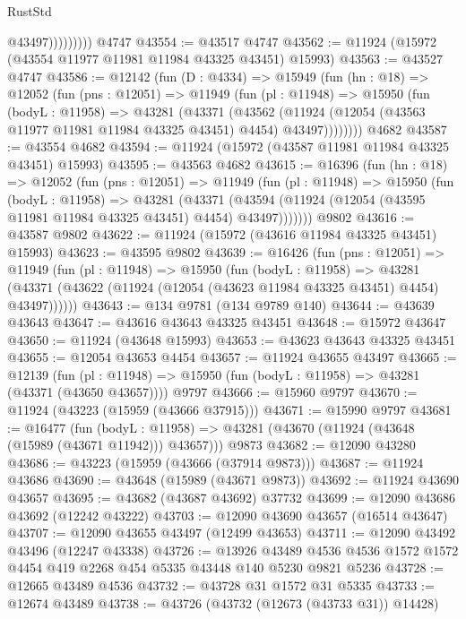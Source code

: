 \begin{lexlean}{RustStd}
\begin{coremodule}
{\begin{coremodule}
{{{{{{{{{{{{{{{{{{{{{{{{{{{{{{{{{{{{{{{{{{{{{{{{{{{{{{{{{{{{{{{{{{{{{{{{{{{{{{{{                      @43497)))))))))
    @4747
@43554 := @43517 @4747
@43562 := @11924 (@15972 (@43554 @11977 @11981 @11984 @43325 @43451) @15993)
@43563 := @43527 @4747
@43586 := @12142
    (fun (D : @4334) =>
    @15949
      (fun (hn : @18) =>
      @12052
        (fun (pns : @12051) =>
        @11949
          (fun (pl : @11948) =>
          @15950
            (fun (bodyL : @11958) =>
            @43281
              (@43371
                (@43562
                  (@11924 (@12054 (@43563 @11977 @11981 @11984 @43325 @43451) @4454) @43497))))))))
    @4682
@43587 := @43554 @4682
@43594 := @11924 (@15972 (@43587 @11981 @11984 @43325 @43451) @15993)
@43595 := @43563 @4682
@43615 := @16396
    (fun (hn : @18) =>
    @12052
      (fun (pns : @12051) =>
      @11949
        (fun (pl : @11948) =>
        @15950
          (fun (bodyL : @11958) =>
          @43281
            (@43371
              (@43594 (@11924 (@12054 (@43595 @11981 @11984 @43325 @43451) @4454) @43497)))))))
    @9802
@43616 := @43587 @9802
@43622 := @11924 (@15972 (@43616 @11984 @43325 @43451) @15993)
@43623 := @43595 @9802
@43639 := @16426
    (fun (pns : @12051) =>
    @11949
      (fun (pl : @11948) =>
      @15950
        (fun (bodyL : @11958) =>
        @43281 (@43371 (@43622 (@11924 (@12054 (@43623 @11984 @43325 @43451) @4454) @43497))))))
@43643 := @134 @9781 (@134 @9789 @140)
@43644 := @43639 @43643
@43647 := @43616 @43643 @43325 @43451
@43648 := @15972 @43647
@43650 := @11924 (@43648 @15993)
@43653 := @43623 @43643 @43325 @43451
@43655 := @12054 @43653 @4454
@43657 := @11924 @43655 @43497
@43665 := @12139
    (fun (pl : @11948) => @15950 (fun (bodyL : @11958) => @43281 (@43371 (@43650 @43657))))
    @9797
@43666 := @15960 @9797
@43670 := @11924 (@43223 (@15959 (@43666 @37915)))
@43671 := @15990 @9797
@43681 := @16477
    (fun (bodyL : @11958) => @43281 (@43670 (@11924 (@43648 (@15989 (@43671 @11942))) @43657)))
    @9873
@43682 := @12090 @43280
@43686 := @43223 (@15959 (@43666 (@37914 @9873)))
@43687 := @11924 @43686
@43690 := @43648 (@15989 (@43671 @9873))
@43692 := @11924 @43690 @43657
@43695 := @43682 (@43687 @43692) @37732
@43699 := @12090 @43686 @43692 (@12242 @43222)
@43703 := @12090 @43690 @43657 (@16514 @43647)
@43707 := @12090 @43655 @43497 (@12499 @43653)
@43711 := @12090 @43492 @43496 (@12247 @43338)
@43726 := @13926
    @43489
    @4536
    @4536
    @1572
    @1572
    @4454
    @419
    @2268
    @454
    @5335
    @43448
    @140
    @5230
    @9821
    @5236
@43728 := @12665 @43489 @4536
@43732 := @43728 @31 @1572 @31 @5335
@43733 := @12674 @43489
@43738 := @43726 (@43732 (@12673 (@43733 @31)) @14428)
}}}}}}}}}}}}}}}}}}}}}}}}}}}}}}}}}}}}}}}}}}}}}}}}}}}}}}}}}}}}}}}}}}}}}}}}}}}}}}}}
\end{coremodule}}
\end{coremodule}
\end{lexlean}
